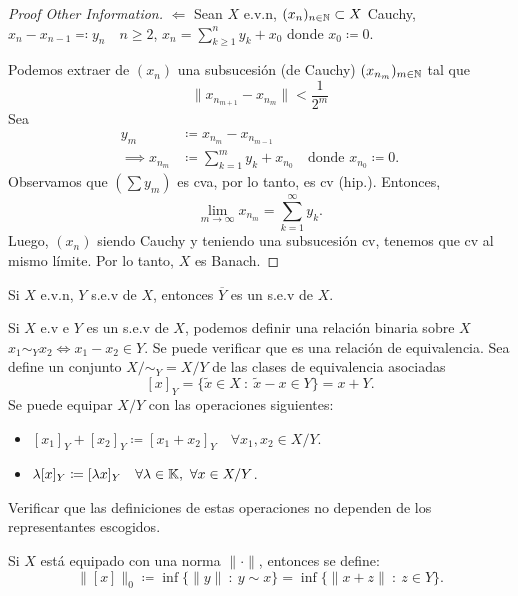 
\begin{proof}[Proof Other Information]
	$\boxed{\Leftarrow}$ Sean $X$ e.v.n, $(x_{n})_{n \in \mathbb{N}} \subset X$ Cauchy, $x_{n} - x_{n - 1} \eqcolon y_{n} \quad n \geq 2$, $x_{n} = \sum_{k \geq 1}^{n} y_{k} + x_{0}$ donde $x_{0} \coloneq 0$. \par
	Podemos extraer de $(x_{n})$ una subsucesión (de Cauchy) $(x_{n_{m}})_{m \in \mathbb{N}}$ tal que
	\[ \| x_{n_{m + 1}} - x_{n_{m}} \| < \frac{1}{2^{m}} \]
	Sea
	\begin{align*}
		y_{m} &\coloneq x_{n_{m}} - x_{n_{m - 1}} \\
		\implies x_{n_{m}} &\coloneq \sum_{k=1}^{m} y_{k} + x_{n_{0}} \quad \text{donde } x_{n_{0}} \coloneq 0
	.\end{align*}
	Observamos que $(\sum y_{m})$ es cva, por lo tanto, es cv (hip.). Entonces,
	\[ \lim_{m \to \infty} x_{n_{m}} = \sum_{k=1}^{\infty} y_{k}. \]
	Luego, $(x_{n})$ siendo Cauchy y teniendo una subsucesión cv, tenemos que cv al mismo límite. Por lo tanto, $X$ es Banach.
\end{proof}

\begin{ex}
	Si $X$ e.v.n, $Y$ s.e.v de $X$, entonces $\overline{Y}$ es un s.e.v de $X$.
\end{ex}

\begin{remark}
	Si $X$ e.v e $Y$ es un s.e.v de $X$, podemos definir una relación binaria sobre $X$ $x_{1} \sim_{Y} x_{2} \iff x_{1} - x_{2} \in Y$. Se puede verificar que es una relación de equivalencia. Sea define un conjunto $X \slash \sim_{Y} = X \slash Y$ de las clases de equivalencia asociadas
	\[ [x]_{Y} = \{\tilde{x} \in X \ : \ \tilde{x} - x \in Y\} = x + Y. \] 
	Se puede equipar $X \slash Y$ con las operaciones siguientes:
	\begin{itemize}
		\item $[x_{1}]_{Y} + [x_{2}]_{Y} \coloneq [x_{1} + x_{2}]_{Y} \quad \forall x_{1},x_{2} \in X \slash Y$.

		\item $\lambda [x]_{Y} \coloneq [\lambda x]_{Y} \quad \forall \lambda \in \mathbb{K},\ \forall x \in X \slash Y$.
	\end{itemize}
	Verificar que las definiciones de estas operaciones no dependen de los representantes escogidos. \par
	Si $X$ está equipado con una norma $\| \cdot \|$, entonces se define:
	\[ \| [x] \|_{0} \coloneq \inf \{\| y \| \ : \ y \sim x\} = \inf \{\| x + z \| \ : \ z \in Y\}. \]  
\end{remark}

